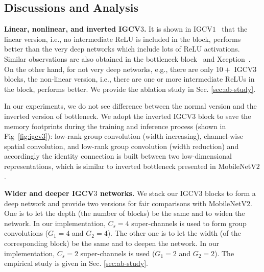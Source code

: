 \documentclass{bmvc2k}
\begin{document}
	\subsection{Discussions and Analysis}
	\noindent\textbf{Linear, nonlinear, and inverted IGCV$3$.}
	It is shown in IGCV$1$~\cite{zhang2017interleaved}
	that the linear version,
	i.e., no intermediate ReLU is included in the block,
	performs better than the very deep networks
	which include lots of ReLU activations.
	Similar observations are also obtained
	in the bottleneck block~\cite{he2016deep} and Xception~\cite{Chollet16a}.
	On the other hand, for not very deep networks,
	e.g., there are only $10+$ IGCV$3$ blocks,
	the non-linear version, i.e.,
	there are one or more intermediate ReLUs in the block,
	performs better.
	We provide the ablation study in Sec. \ref{sec:ab-study}.

	In our experiments, we do not see difference between the normal version and the inverted version of bottleneck. We adopt the inverted IGCV$3$ block to save the memory footprints during the training and inference process (shown in Fig~\ref{fig:igcv3}):
	low-rank group convolution (width increasing),
	channel-wise spatial convolution,
	and low-rank group convolution (width reduction)
	and accordingly the identity connection is built between two low-dimensional representations, which is similar to inverted bottleneck presented in MobileNetV$2$ \cite{sandler2018inverted}.

	\noindent\textbf{Wider and deeper IGCV$3$ networks.}
	We stack our IGCV$3$ blocks to form a deep network and provide two versions for fair comparisons with MobileNetV$2$.
	One is to let the depth (the number of blocks) be the same and to
	widen the network. In our implementation,
	$C_s=4$ super-channels is used to form group convolutions ($G_1=4$ and $G_2=4$).
	The other one is to let the width (of the corresponding block) be the same
	and to deepen the network.
	In our implementation, $C_s = 2$ super-channels is used ($G_1=2$ and $G_2=2$).
	The empirical study is given in Sec. \ref{sec:ab-study}.

\end{document}
